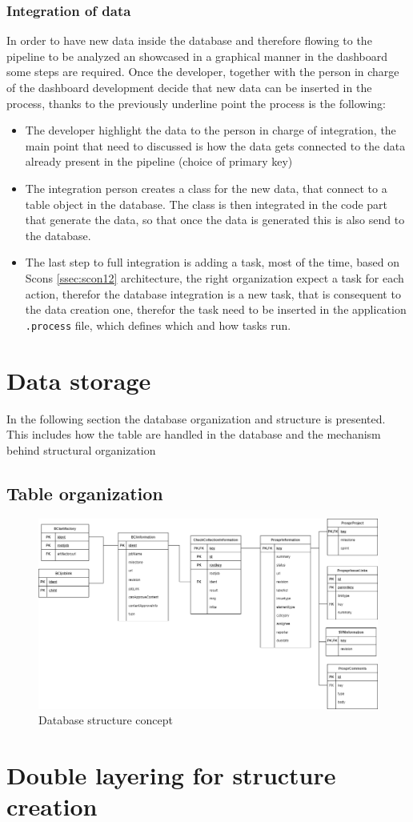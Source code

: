 \documentclass[../main.tex]{subfiles}
\begin{document}
\subsubsection{Integration of data}
In order to have new data inside the database and therefore flowing to the pipeline to be analyzed an showcased in a graphical manner in the dashboard some steps are required. Once the developer, together with the person in charge of the dashboard development decide that new data can be inserted in the process, thanks to the previously underline point the process is the following:
\begin{itemize}
    \item The developer highlight the data to the person in charge of integration, the main point that need to discussed is how the data gets connected to the data already present in the pipeline (choice of primary key)
    \item The integration person creates a class for the new data, that connect to a table object in the database. The class is then integrated in the code part that generate the data, so that once the data is generated this is also send to the database.
    \item The last step to full integration is adding a task, most of the time, based on Scons \ref{ssec:scon12} architecture, the right organization expect a task for each action, therefor the database integration is a new task, that is consequent to the data creation one, therefor the task need to be inserted in the application \texttt{.process} file, which defines which and how tasks run. 
\end{itemize}
\section{Data storage}
In the following section the database organization and structure is presented. This includes how the table are handled in the database and the mechanism behind structural organization
\subsection{Table organization}
\begin{figure}[H]
    \centering
    \includegraphics[width=\linewidth]{images_folder/EADBEntity.png}
    \caption{Database structure concept}
    \label{fig:dbsterconce}
\end{figure}
\section{Double layering for structure creation}
\cleardoublepage
\end{document}
